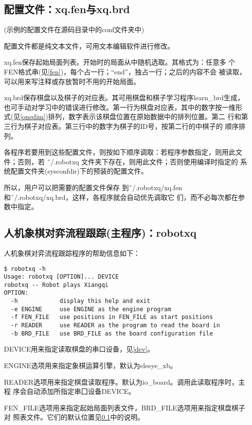 \documentclass[a4paper]{article}
\begin{document}
\subsection{配置文件：xq.fen与xq.brd}
\label{conf}
(示例的配置文件在源码目录中的conf文件夹中)

配置文件都是纯文本文件，可用文本编辑软件进行修改。

xq.fen保存起始局面列表。开始时的局面从中随机选取。其格式为：任意多
个FEN格式串(见\ref{fen})，每个占一行；``end''，独占一行；之后的内容不会
被读取，可以用来写注释或存放暂时不用的开始局面。

xq.brd保存棋盘以及棋子的对应表。其可用棋盘和棋子学习程序learn\_brd生成，
也可手动对学习中的错误进行修改。第一行为棋盘对应表，其中的数字按一维形
式(见\ref{onedim})排列，数字表示该棋盘位置在原始数据中的排列位置。第二
行和第三行为棋子对应表。第三行中的数字为棋子的ID号，按第二行的中棋子的
顺序排列。

各程序若要用到这些配置文件，则按如下顺序调取：若程序参数指定，则用此文
件；否则，若 \~\ /.robotxq 文件夹下存在，则用此文件；否则使用编译时指定的
系统配置文件夹(sysconfdir)下的预装的配置文件。

所以，用户可以把需要的配置文件保存
到\~\ /.robotxq/xq.fen和\~\ /.robotxq/xq.brd，这样，各程序就会自动优先调取它
们，而不必每次都在参数中指定。

\subsection{人机象棋对弈流程跟踪(主程序)：robotxq}
人机象棋对弈流程跟踪程序的帮助信息如下：
\begin{verbatim}
$ robotxq -h
Usage: robotxq [OPTION]... DEVICE
robotxq -- Robot plays Xiangqi
OPTION:
  -h            display this help and exit
  -e ENGINE     use ENGINE as the engine program
  -f FEN_FILE   use positions in FEN_FILE as start positions
  -r READER     use READER as the program to read the board in
  -b BRD_FILE   use BRD_FILE as the board configuration file
\end{verbatim}

DEVICE用来指定读取棋盘的串口设备，见\ref{dev}。

ENGINE选项用来指定象棋运算引擎，默认为eleeye\_xb。

READER选项用来指定棋盘读取程序。默认为io\_board。调用此读取程序时，主程
序会自动添加所指定串囗设备DEVICE。

FEN\_FILE选项用来指定起始局面列表文件，BRD\_FILE选项用来指定棋盘棋子对
照表文件。它们的默认位置见\ref{conf}中的说明。
\end{document}
